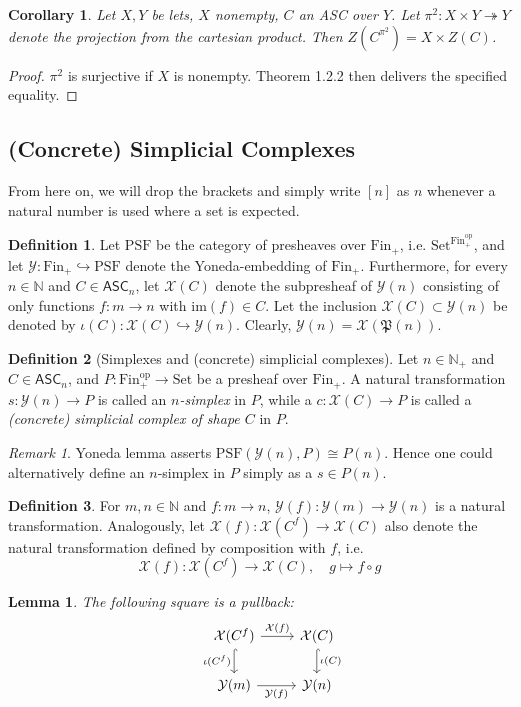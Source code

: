 \documentclass{article}
\newtheorem{lemma}{Lemma}[subsection]
\newtheorem{corollary}{Corollary}[subsection]
\theoremstyle{remark}
\newtheorem{remark}{Remark}[subsection]
\theoremstyle{definition}
\newtheorem{definition}{Definition}[subsection]
\newcommand{\N}{\mathbb N}
\newcommand{\Fin}{\mathrm{Fin}}
\newcommand{\Set}{\mathrm{Set}}
\newcommand{\PSF}{\mathrm{PSF}}
\newcommand{\op}{\mathrm{op}}
\newcommand{\p}{\mathfrak P}
\newcommand{\ASC}{\mathsf{ASC}}
\newcommand{\im}{\mathrm{im}}
\newcommand{\Y}{\mathcal Y}
\newcommand{\X}{\mathcal X}
\begin{document}
	\begin{corollary}\label{centerpi}
		Let $X,Y$ be lets, $X$ nonempty, $C$ an ASC over $Y$. Let $\pi^2:X\times Y\twoheadrightarrow Y$ denote the projection from the cartesian product. Then $Z\left(C^{\pi^2}\right)=X\times Z(C)$.
	\end{corollary}
	\begin{proof}
		$\pi^2$ is surjective if $X$ is nonempty. Theorem 1.2.2 then delivers the specified equality.
	\end{proof}
	\subsection{(Concrete) Simplicial Complexes}
	From here on, we will drop the brackets and simply write $[n]$ as $n$ whenever a natural number is used where a set is expected.
	\begin{definition}
		Let $\PSF$ be the category of presheaves over $\Fin_+$, i.e. $\Set^{\Fin_+^\op}$, and let $\Y:\Fin_+\hookrightarrow\PSF$ denote the Yoneda-embedding of $\Fin_+$. Furthermore, for every $n\in\N$ and $C\in\ASC_n$, let $\X(C)$ denote the subpresheaf of $\Y(n)$ consisting of only functions $f:m\to n$ with $\im(f)\in C$. Let the inclusion $\X(C)\subset\Y(n)$ be denoted by $\iota(C):\X(C)\hookrightarrow\Y(n)$. Clearly, $\Y(n)=\X(\p(n))$.
	\end{definition}
	\begin{definition}[Simplexes and (concrete) simplicial complexes]
		Let $n\in\N_+$ and $C\in\ASC_n$, and $P:\Fin_+^\op\to\Set$ be a presheaf over $\Fin_+$. A natural transformation $s:\Y(n)\to P$ is called an \textit{$n$-simplex} in $P$, while a $c:\X(C)\to P$ is called a \textit{(concrete) simplicial complex of shape $C$} in $P$.
	\end{definition}
	\begin{remark}
		Yoneda lemma asserts $\PSF(\Y(n),P)\cong P(n)$. Hence one could alternatively define an $n$-simplex in $P$ simply as a $s\in P(n)$.
	\end{remark}
	\begin{definition}
		For $m,n\in\N$ and $f:m\to n$, $\Y(f):\Y(m)\to\Y(n)$ is a natural transformation. Analogously, let $\X(f):\X(C^f)\to\X(C)$ also denote the natural transformation defined by composition with $f$, i.e.
		\[\X(f):\X(C^f)\to\X(C),\quad g\mapsto f\circ g\]
	\end{definition}
	\begin{lemma}
		The following square is a pullback:
		\[\begin{tikzcd}
			&\X(C^f)\arrow{r}{\X(f)}\arrow[hook]{d}[swap]{\iota(C^f)}&\X(C)\arrow[hook]{d}{\iota(C)}\\
			&\Y(m)\arrow{r}[swap]{\Y(f)}&\Y(n)
		\end{tikzcd}\]
	\end{lemma}
\end{document}
